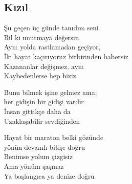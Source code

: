\subsection{Kızıl}

Şu geçen üç günde tanıdım seni \\
Bil ki unutmaya değersin. \\
Aynı yolda rastlamadan geçiyor, \\
İki hayat kaçırıyoruz birbirinden habersiz \\
Kazananlar değişmez, aynı \\
Kaybedenlerse hep biziz

\noindent\newline
Bunu bilmek işine gelmez ama; \\
her gidişin bir gidişi vardır \\
İnsan gittikçe daha da \\
Uzaklaşabilir sevdiğinden

\noindent\newline
Hayat bir maraton belki gözünde \\
yönün devamlı bitişe doğru \\
Benimse yolum çizgisiz \\
Ama yönüm şaşmaz \\
Ya başlangıca ya denize doğru